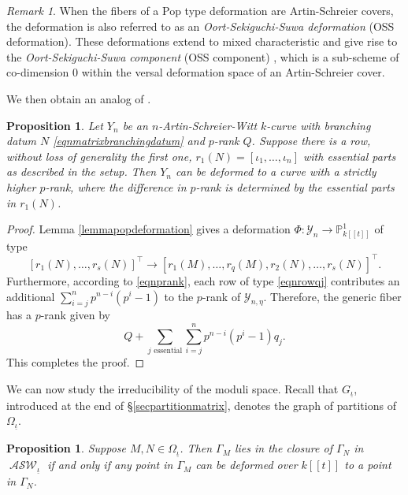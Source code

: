 \documentclass{compositio}
\newtheorem{proposition}[theorem]{Proposition}
\theoremstyle{remark}
\theoremstyle{remark}
\newtheorem{remark}[theorem]{Remark}
\DeclareMathOperator{\ASW}{\mathcal{ASW}}
\begin{document}
\begin{remark}
When the fibers of a Pop type deformation are Artin-Schreier covers, the deformation is also referred to as an \textit{Oort-Sekiguchi-Suwa deformation} (OSS deformation). These deformations extend to mixed characteristic and give rise to the \textit{Oort-Sekiguchi-Suwa component} (OSS component) \cite[\S 4.3]{MR1767273}, which is a sub-scheme of co-dimension $0$ within the versal deformation space of an Artin-Schreier cover.
\end{remark}

We then obtain an analog of \cite[Proposition 4.2]{MR2985514}.

\begin{proposition}
Let $Y_n$ be an $n$-Artin-Schreier-Witt $k$-curve with branching datum $N$ \eqref{eqnmatrixbranchingdatum} and $p$-rank $Q$. Suppose there is a row, without loss of generality the first one, $r_1(N) = [\iota_1, \ldots, \iota_n]$ with essential parts as described in the setup. Then $Y_n$ can be deformed to a curve with a strictly higher $p$-rank, where the difference in $p$-rank is determined by the essential parts in $r_1(N)$.
\end{proposition}

\begin{proof}
    Lemma \ref{lemmapopdeformation} gives a deformation $\Phi: \mathscr{Y}_n \xrightarrow{} \mathbb{P}^1_{k[[t]]}$ of type $$[r_1(N), \ldots, r_s(N)]^{\top} \rightarrow [r_{1}(M), \ldots, r_{q}(M), r_2(N), \ldots, r_s(N)]^{\top}.$$ 
    Furthermore, according to \eqref{eqnprank}, each row of type \eqref{eqnrowqj} contributes an additional $\sum_{i=j}^n p^{n-i} (p^i-1)$ to the $p$-rank of $\mathscr{Y}_{n, \eta}$. Therefore, the generic fiber has a $p$-rank given by
    \begin{equation*}
        Q + \sum_{j \text{ essential}} \sum_{i=j}^n p^{n-i} (p^i-1) q_j.
    \end{equation*}
    This completes the proof.
\end{proof}

We can now study the irreducibility of the moduli space. Recall that $G_{\underline{\iota}}$, introduced at the end of \S \ref{secpartitionmatrix}, denotes the graph of partitions of $\Omega_{\underline{\iota}}$. 

\begin{proposition}
\label{propclosuredeformation}
Suppose $M, N \in \Omega_{\underline{\iota}}$. Then $\Gamma_{M}$ lies in the closure of $\Gamma_{N}$ in $\ASW_{\underline{\iota}}$ if and only if any point in $\Gamma_{M}$ can be deformed over $k[[t]]$ to a point in $\Gamma_{N}$.
\end{proposition}
\end{document}
